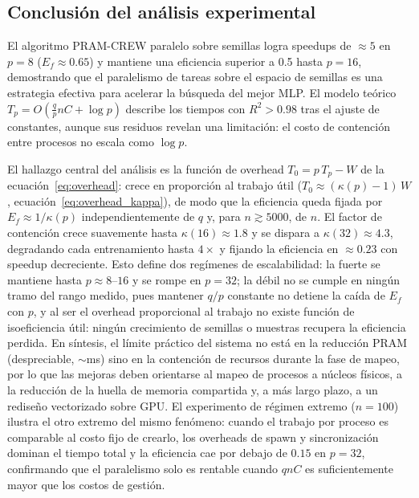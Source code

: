 \documentclass[11pt, a4paper]{article}
\begin{document}
\subsection{Conclusión del análisis experimental}

El algoritmo PRAM-CREW paralelo sobre semillas logra speedups de $\approx 5$ en $p = 8$ ($E_f \approx 0.65$) y mantiene una eficiencia superior a 0.5 hasta $p = 16$, demostrando que el paralelismo de tareas sobre el espacio de semillas es una estrategia efectiva para acelerar la búsqueda del mejor MLP. El modelo teórico $T_p = O\!\left(\frac{q}{p} n C + \log p\right)$ describe los tiempos con $R^2 > 0.98$ tras el ajuste de constantes, aunque sus residuos revelan una limitación: el costo de contención entre procesos no escala como $\log p$.

El hallazgo central del análisis es la función de overhead $T_0 = p\,T_p - W$ de la ecuación~\eqref{eq:overhead}: crece en proporción al trabajo útil ($T_0 \approx (\kappa(p)-1)\,W$, ecuación~\eqref{eq:overhead_kappa}), de modo que la eficiencia queda fijada por $E_f \approx 1/\kappa(p)$ independientemente de $q$ y, para $n \gtrsim 5000$, de $n$. El factor de contención crece suavemente hasta $\kappa(16) \approx 1.8$ y se dispara a $\kappa(32) \approx 4.3$, degradando cada entrenamiento hasta $4\times$ y fijando la eficiencia en $\approx 0.23$ con speedup decreciente. Esto define dos regímenes de escalabilidad: la fuerte se mantiene hasta $p \approx 8$--$16$ y se rompe en $p = 32$; la débil no se cumple en ningún tramo del rango medido, pues mantener $q/p$ constante no detiene la caída de $E_f$ con $p$, y al ser el overhead proporcional al trabajo no existe función de isoeficiencia útil: ningún crecimiento de semillas o muestras recupera la eficiencia perdida. En síntesis, el límite práctico del sistema no está en la reducción PRAM (despreciable, $\sim$ms) sino en la contención de recursos durante la fase de mapeo, por lo que las mejoras deben orientarse al mapeo de procesos a núcleos físicos, a la reducción de la huella de memoria compartida y, a más largo plazo, a un rediseño vectorizado sobre GPU. El experimento de régimen extremo ($n = 100$) ilustra el otro extremo del mismo fenómeno: cuando el trabajo por proceso es comparable al costo fijo de crearlo, los overheads de spawn y sincronización dominan el tiempo total y la eficiencia cae por debajo de $0.15$ en $p = 32$, confirmando que el paralelismo solo es rentable cuando $qnC$ es suficientemente mayor que los costos de gestión.

\end{document}
